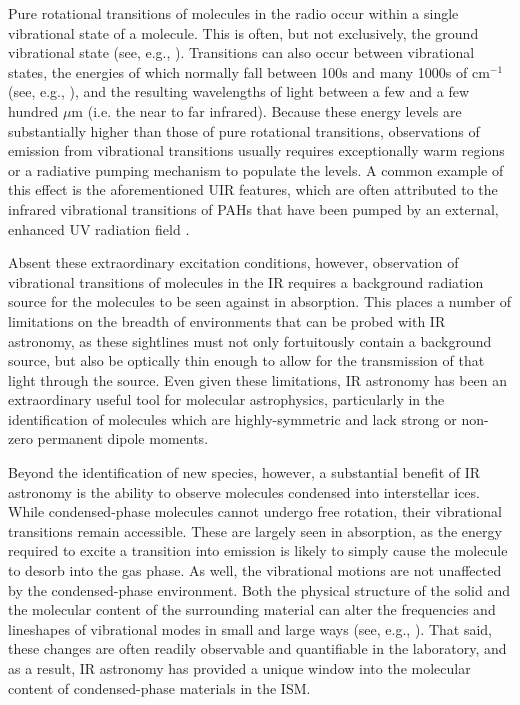 \documentclass[twocolumn]{aastex631}
\begin{document}
Pure rotational transitions of molecules in the radio occur within a single vibrational state of a molecule.  This is often, but not exclusively, the ground vibrational state (see, e.g., \citealt{Goldsmith:1983bc}).  Transitions can also occur between vibrational states, the energies of which normally fall between 100s and many 1000s of cm$^{-1}$ (see, e.g.,  \citealt{Stull:1962cl}), and the resulting wavelengths of light between a few and a few hundred $\mu$m (i.e. the near to far infrared).  Because these energy levels are substantially higher than those of pure rotational transitions, observations of emission from vibrational transitions usually requires exceptionally warm regions or a radiative pumping mechanism to populate the levels.  A common example of this effect is the aforementioned UIR features, which are often attributed to the infrared vibrational transitions of PAHs that have been pumped by an external, enhanced UV radiation field \citep{Tielens:2008fx}.  

Absent these extraordinary excitation conditions, however, observation of vibrational transitions of molecules in the IR requires a background radiation source for the molecules to be seen against in absorption.  This places a number of limitations on the breadth of environments that can be probed with IR astronomy, as these sightlines must not only fortuitously contain a background source, but also be optically thin enough to allow for the transmission of that light through the source. Even given these limitations, IR astronomy has been an extraordinary useful tool for molecular astrophysics, particularly in the identification of molecules which are highly-symmetric and lack strong or non-zero permanent dipole moments.

Beyond the identification of new species, however, a substantial benefit of IR astronomy is the ability to observe molecules condensed into interstellar ices.  While condensed-phase molecules cannot undergo free rotation, their vibrational transitions remain accessible.  These are largely seen in absorption, as the energy required to excite a transition into emission is likely to simply cause the molecule to desorb into the gas phase.  As well, the vibrational motions are not unaffected by the condensed-phase environment.  Both the physical structure of the solid and the molecular content of the surrounding material can alter the frequencies and lineshapes of vibrational modes in small and large ways (see, e.g., \citealt{Cooke:2016hw}).  That said, these changes are often readily observable and quantifiable in the laboratory, and as a result, IR astronomy has provided a unique window into the molecular content of condensed-phase materials in the ISM.
\end{document}
